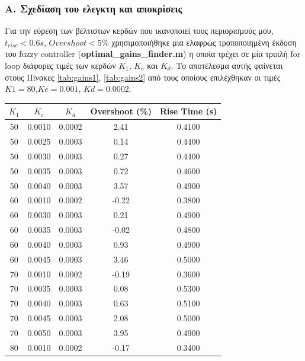 \documentclass[12pt]{report}
\begin{document}
\subsubsection{Α. Σχεδίαση του ελεγκτη και αποκρίσεις}
Για την εύρεση των βέλτιστων κερδών που ικανοποιεί τους περιορισμούς μου, $t_{rise}<0.6s$, $Overshoot<5\%$ χρησιμοποιήθηκε μια ελαφρώς τροποποιημένη έκδοση του fuzzy controller (\textbf{optimal\_gains\_finder.m}) η οποία τρέχει σε μία τριπλή for loop διάφορες τιμές των κερδών $K_1$, $K_e$ και $K_d$. Το αποτέλεσμα αυτής φαίνεται στους Πίνακες \ref{tab:gains1}, \ref{tab:gains2} από τους οποίους επιλέχθηκαν οι τιμές $K1=80$,$Ke=0.001$, $Kd=0.0002$.

\begin{table}[H]
    \centering
    \begin{tabular}{|c|c|c|c|c|}
    \hline
    {$K_1$} & {$K_e$} & {$K_d$} & {Overshoot (\%)} & {Rise Time (s)} \\
    \hline
    50      & 0.0010  & 0.0002  &  2.41            & 0.4100 \\
    50      & 0.0025  & 0.0003  &  0.14            & 0.4400 \\
    50      & 0.0030  & 0.0003  &  0.27            & 0.4400 \\
    50      & 0.0035  & 0.0003  &  0.72            & 0.4600 \\
    50      & 0.0040  & 0.0003  &  3.57            & 0.4900 \\
    60      & 0.0010  & 0.0002  & -0.22            & 0.3800 \\
    60      & 0.0030  & 0.0003  &  0.21            & 0.4900 \\
    60      & 0.0035  & 0.0003  & -0.02            & 0.4800 \\
    60      & 0.0040  & 0.0003  &  0.93            & 0.4900 \\
    60      & 0.0045  & 0.0003  &  3.46            & 0.5000 \\
    70      & 0.0010  & 0.0002  & -0.19            & 0.3600 \\
    70      & 0.0035  & 0.0003  &  0.08            & 0.5300 \\
    70      & 0.0040  & 0.0003  &  0.63            & 0.5100 \\
    70      & 0.0045  & 0.0003  &  2.08            & 0.5000 \\
    70      & 0.0050  & 0.0003  &  3.95            & 0.4900 \\
    80      & 0.0010  & 0.0002  & -0.17            & 0.3400 \\

\end{tabular}
\end{table}
\end{document}
